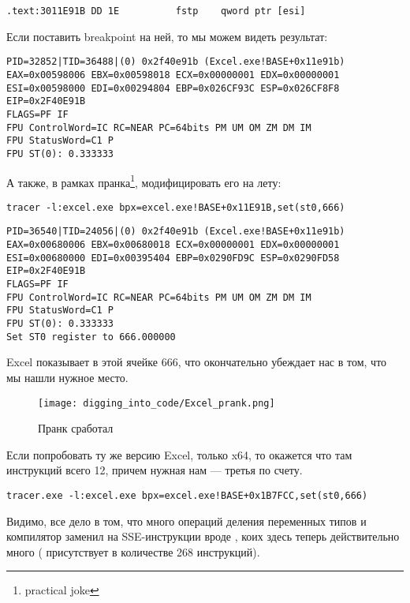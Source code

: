 \begin{lstlisting}[style=customasmx86]
.text:3011E91B DD 1E          fstp    qword ptr [esi]
\end{lstlisting}

Если поставить breakpoint на ней, то мы можем видеть результат:

\begin{lstlisting}
PID=32852|TID=36488|(0) 0x2f40e91b (Excel.exe!BASE+0x11e91b)
EAX=0x00598006 EBX=0x00598018 ECX=0x00000001 EDX=0x00000001
ESI=0x00598000 EDI=0x00294804 EBP=0x026CF93C ESP=0x026CF8F8
EIP=0x2F40E91B
FLAGS=PF IF
FPU ControlWord=IC RC=NEAR PC=64bits PM UM OM ZM DM IM 
FPU StatusWord=C1 P 
FPU ST(0): 0.333333
\end{lstlisting}

А также, в рамках пранка\footnote{practical joke}, модифицировать его на лету:

\begin{lstlisting}
tracer -l:excel.exe bpx=excel.exe!BASE+0x11E91B,set(st0,666)
\end{lstlisting}

\begin{lstlisting}
PID=36540|TID=24056|(0) 0x2f40e91b (Excel.exe!BASE+0x11e91b)
EAX=0x00680006 EBX=0x00680018 ECX=0x00000001 EDX=0x00000001
ESI=0x00680000 EDI=0x00395404 EBP=0x0290FD9C ESP=0x0290FD58
EIP=0x2F40E91B
FLAGS=PF IF
FPU ControlWord=IC RC=NEAR PC=64bits PM UM OM ZM DM IM 
FPU StatusWord=C1 P 
FPU ST(0): 0.333333
Set ST0 register to 666.000000
\end{lstlisting}

Excel показывает в этой ячейке 666, что окончательно убеждает нас в том, что мы нашли нужное место.

\begin{figure}[H]
\centering
\texttt{[image: digging\_into\_code/Excel\_prank.png]}
\caption{Пранк сработал}
\end{figure}

Если попробовать ту же версию Excel, только x64, то окажется что там инструкций \FDIV всего 12, 
причем нужная нам --- третья по счету.

\begin{lstlisting}
tracer.exe -l:excel.exe bpx=excel.exe!BASE+0x1B7FCC,set(st0,666)
\end{lstlisting}

Видимо, все дело в том, что много операций деления переменных типов \Tfloat и \Tdouble 
компилятор заменил на SSE-инструкции вроде , 
коих здесь теперь действительно много ( присутствует в количестве 268 инструкций).


